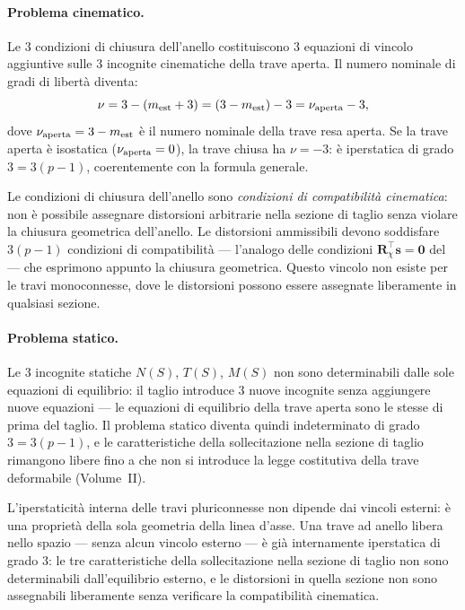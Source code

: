 \paragraph{Problema cinematico.}
Le $3$ condizioni di chiusura dell'anello
costituiscono $3$ equazioni di vincolo aggiuntive
sulle $3$ incognite cinematiche della trave aperta.
Il numero nominale di gradi di libertà diventa:
\begin{equation}
	\nu = 3 - (m_{\rm est} + 3)
	= (3 - m_{\rm est}) - 3
	= \nu_{\rm aperta} - 3,
\end{equation}
dove $\nu_{\rm aperta} = 3 - m_{\rm est}$ è il
numero nominale della trave resa aperta. Se la
trave aperta è isostatica ($\nu_{\rm aperta} = 0$),
la trave chiusa ha $\nu = -3$: è iperstatica di
grado $3 = 3(p-1)$, coerentemente con la formula
generale.

Le condizioni di chiusura dell'anello sono
\emph{condizioni di compatibilità cinematica}:
non è possibile assegnare distorsioni arbitrarie
nella sezione di taglio senza violare la chiusura
geometrica dell'anello. Le distorsioni ammissibili
devono soddisfare $3(p-1)$ condizioni di
compatibilità --- l'analogo delle condizioni
$\bm{R}_\chi^\top \bm{s} = \bm{0}$ del
 --- che
esprimono appunto la chiusura geometrica.
Questo vincolo non esiste per le travi monoconnesse,
dove le distorsioni possono essere assegnate
liberamente in qualsiasi sezione.


\paragraph{Problema statico.}
Le $3$ incognite statiche $N(S)$, $T(S)$, $M(S)$
non sono determinabili dalle sole equazioni di
equilibrio: il taglio introduce $3$ nuove incognite
senza aggiungere nuove equazioni --- le equazioni
di equilibrio della trave aperta sono le stesse di
prima del taglio. Il problema statico diventa quindi
indeterminato di grado $3 = 3(p-1)$, e le
caratteristiche della sollecitazione nella sezione
di taglio rimangono libere fino a che non si
introduce la legge costitutiva della trave
deformabile (Volume~II).



\begin{oss}
	L'iperstaticità interna delle travi pluriconnesse
	non dipende dai vincoli esterni: è una proprietà
	della sola geometria della linea d'asse. Una
	trave ad anello libera nello spazio --- senza
	alcun vincolo esterno --- è già internamente
	iperstatica di grado $3$: le tre caratteristiche
	della sollecitazione nella sezione di taglio
	non sono determinabili dall'equilibrio esterno,
	e le distorsioni in quella sezione non sono
	assegnabili liberamente senza verificare la
	compatibilità cinematica.
\end{oss}

